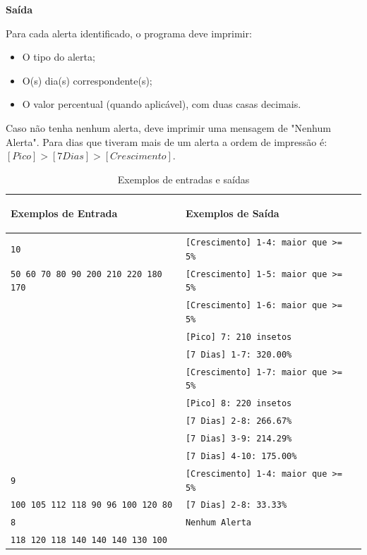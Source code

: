 \vspace{0.3cm}
\textbf{Saída}

    Para cada alerta identificado, o programa deve imprimir:
    \begin{itemize}
        \item O tipo do alerta;
        \item O(s) dia(s) correspondente(s);
        \item O valor percentual (quando aplicável), com duas casas decimais.
    \end{itemize}
    Caso não tenha nenhum alerta, deve imprimir uma mensagem de "Nenhum Alerta".
    Para dias que tiveram mais de um alerta a ordem de impressão é: $[Pico] > [7 Dias] > [Crescimento]$.
 
\begin{table}[h]
    \centering
    \footnotesize
    \begin{tabular}{|p{8cm}|p{8cm}|}
        \hline
        \begin{center}
            \vspace{-0.3cm}
            \textbf{Exemplos de Entrada}
            \vspace{-0.3cm}
        \end{center} 
         &  
        \begin{center}
            \vspace{-0.3cm}
            \textbf{Exemplos de Saída}
            \vspace{-0.3cm}
        \end{center} \\ \hline
		    \texttt{10} & \texttt{[Crescimento] 1-4: maior que >= 5\% } \\
                \texttt{50 60 70 80 90 200 210 220 180 170} & \texttt{[Crescimento] 1-5: maior que >= 5\% } \\
& \texttt{[Crescimento] 1-6: maior que >= 5\% } \\
& \texttt{[Pico] 7: 210 insetos} \\
& \texttt{[7 Dias] 1-7: 320.00\%} \\
& \texttt{[Crescimento] 1-7: maior que >= 5\% } \\
& \texttt{[Pico] 8: 220 insetos} \\
& \texttt{[7 Dias] 2-8: 266.67\%} \\
& \texttt{[7 Dias] 3-9: 214.29\%} \\
& \texttt{[7 Dias] 4-10: 175.00\%} \\


         \hline
   		    \texttt{9}   & \texttt{[Crescimento] 1-4: maior que >= 5\% } \\
            \texttt{100 105 112 118 90 96 100 120 80} & \texttt{[7 Dias] 2-8: 33.33\%} \\
         \hline    
   		    \texttt{8}   & \texttt{Nenhum Alerta} \\
            \texttt{118 120 118 140 140 140 130 100} & \\
         \hline    
    \end{tabular}
    \caption{Exemplos de entradas e saídas}

\end{table}

\normalsize

\newpage

\begin{center}

\end{center}
